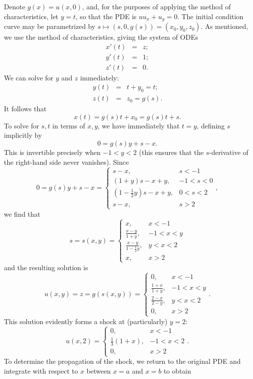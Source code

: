 \documentclass{article}
\begin{document}
\begin{enumerate}
Denote \(g(x) = u(x,0)\), and, for the purposes of applying the method of characteristics, let \(y = t\), so that the PDE is \(uu_x + u_y = 0\).  The initial condition curve may be parametrized by \(s \mapsto (s,0,g(s)) = (x_0,y_0,z_0)\).  As mentioned, we use the method of characteristics, giving the system of ODEs
\begin{eqnarray*}
x'(t) & = & z; \\
y'(t) & = & 1; \\
z'(t) & = & 0.
\end{eqnarray*}
We can solve for \(y\) and \(z\) immediately:
\begin{eqnarray*}
y(t) & = & t + y_0 = t; \\
z(t) & = & z_0 = g(s).
\end{eqnarray*}
It follows that
\[x(t) = g(s) t + x_0 = g(s) t + s.\]
To solve for \(s,t\) in terms of \(x,y\), we have immediately that \(t = y\), defining \(s\) implicitly by
\[0 = g(s) y + s - x.\]
This is invertible precisely when \(-1 < y < 2\) (this ensures that the \(s\)-derivative of the right-hand side never vanishes).  Since
\[0 = g(s) y + s - x = \begin{cases} s - x, & s < -1 \\ (1 + y) s - x + y, & -1 < s < 0 \\ \left( 1 - \frac{1}{2} y \right) s - x + y, & 0 < s < 2 \\ s - x, & s > 2 \end{cases},\]
we find that
\[s = s(x,y) = \begin{cases} x, & x < -1 \\ \frac{x - y}{1 + y}, & -1 < x < y \\ \frac{x - y}{1 - \frac{1}{2} y}, & y < x < 2 \\ x, & x > 2 \end{cases}\]
and the resulting solution is
\[u(x,y) = z = g(s(x,y)) = \begin{cases} 0, & x < -1 \\ \frac{1 + x}{1 + y}, & -1 < x < y \\ \frac{2 - x}{2 - y}, & y < x < 2 \\ 0, & x > 2 \end{cases}.\]
This solution evidently forms a shock at (particularly) \(y = 2\):
\[u(x,2) = \begin{cases} 0, & x < -1 \\ \frac{1}{3} (1 + x), & -1 < x < 2 \\ 0, & x > 2 \end{cases}.\]
To determine the propagation of the shock, we return to the original PDE and integrate with respect to \(x\) between \(x = a\) and \(x = b\) to obtain

\end{enumerate}
\end{document}
